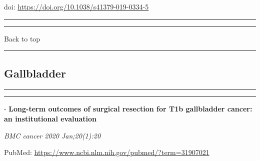 \documentclass[
]{article}
\begin{document}
doi: \url{https://doi.org/10.1038/s41379-019-0334-5}

\begin{center}\rule{0.5\linewidth}{0.5pt}\end{center}

\begin{center}\rule{0.5\linewidth}{0.5pt}\end{center}

Back to top

\begin{center}\rule{0.5\linewidth}{0.5pt}\end{center}

\pagebreak

\hypertarget{gallbladder}{%
\subsection{Gallbladder}\label{gallbladder}}

\begin{center}\rule{0.5\linewidth}{0.5pt}\end{center}

\begin{center}\rule{0.5\linewidth}{0.5pt}\end{center}

- \textbf{Long-term outcomes of surgical resection for T1b gallbladder
cancer: an institutional evaluation}

\emph{BMC cancer 2020 Jan;20(1):20}

PubMed: \url{https://www.ncbi.nlm.nih.gov/pubmed/?term=31907021}
\end{document}
